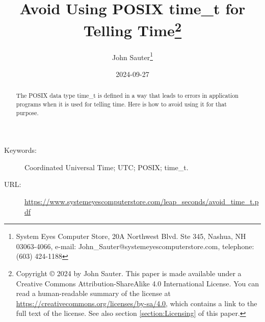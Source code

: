 \documentclass[letterpaper,twoside]{article}
\begin{document}
\title{Avoid Using POSIX {\ttfamily time\_t} for Telling
  Time\footnote{Copyright
    {\copyright} 2024 by John Sauter.
    This paper is made available under a
    Creative Commons Attribution-ShareAlike 4.0 International License.
    You can read a human-readable summary of the license at
    \href{https://creativecommons.org/licenses/by-sa/4.0}{https://creativecommons.org/licenses/by-sa/4.0},
    which contains a link to the full text of the license.
    See also section \ref{section:Licensing} of this paper.}
}
\author{John Sauter\footnote{
    System Eyes Computer Store,
    20A Northwest Blvd.  Ste 345,
    Nashua, NH  03063-4066,
    e-mail: John\_Sauter@systemeyescomputerstore.com,
    telephone: (603) 424-1188}}

\date{2024-09-27}
\maketitle
\begin{abstract}
  The POSIX data type {\ttfamily time\_t} is defined in a way that leads
  to errors in application programs when it is used for telling time.
  Here is how to avoid using it for that purpose.
\end{abstract}
\begin{description}
\item[Keywords:]Coordinated Universal Time; UTC; POSIX; time\_t.
\item[URL:]\href{https://www.systemeyescomputerstore.com/leap\_seconds/avoid\_time\_t.pdf}{https://www.systemeyescomputerstore.com/leap\_seconds/avoid\_time\_t.pdf}
\end{description}
\newpage
\end{document}
